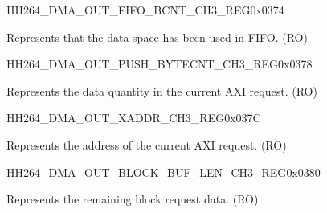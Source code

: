 \begin{register}{H}{H264\_DMA\_OUT\_FIFO\_BCNT\_CH3\_REG}{0x0374}\label{regdesc:H264DMAOUTFIFOBCNTCH3REG}
%
%
\regnewline%
\begin{regdesc}\begin{reglist}
\label{fielddesc:H264DMAOUTCMDFIFOOUTFIFOBCNTCH3}\item [H264\_DMA\_OUT\_CMDFIFO\_OUTFIFO\_BCNT\_CH3] Represents that the data space has been used in FIFO. (RO)
\end{reglist}\end{regdesc}
\end{register}


\begin{register}{H}{H264\_DMA\_OUT\_PUSH\_BYTECNT\_CH3\_REG}{0x0378}\label{regdesc:H264DMAOUTPUSHBYTECNTCH3REG}
%
%
\regnewline%
\begin{regdesc}\begin{reglist}
\label{fielddesc:H264DMAOUTCMDFIFOPUSHBYTECNTCH3}\item [H264\_DMA\_OUT\_CMDFIFO\_PUSH\_BYTECNT\_CH3] Represents the data quantity in the current AXI request. (RO)
\end{reglist}\end{regdesc}
\end{register}


\begin{register}{H}{H264\_DMA\_OUT\_XADDR\_CH3\_REG}{0x037C}\label{regdesc:H264DMAOUTXADDRCH3REG}
%
\regnewline%
\begin{regdesc}\begin{reglist}
\label{fielddesc:H264DMAOUTCMDFIFOXADDRCH3}\item [H264\_DMA\_OUT\_CMDFIFO\_XADDR\_CH3] Represents the address of the current AXI request. (RO)
\end{reglist}\end{regdesc}
\end{register}


\begin{register}{H}{H264\_DMA\_OUT\_BLOCK\_BUF\_LEN\_CH3\_REG}{0x0380}\label{regdesc:H264DMAOUTBLOCKBUFLENCH3REG}
%
%
\regnewline%
\begin{regdesc}\begin{reglist}
\label{fielddesc:H264DMAOUTBLOCKBUFLENCH3}\item [H264\_DMA\_OUT\_BLOCK\_BUF\_LEN\_CH3] Represents the remaining block request data. (RO)
\end{reglist}\end{regdesc}
\end{register}

